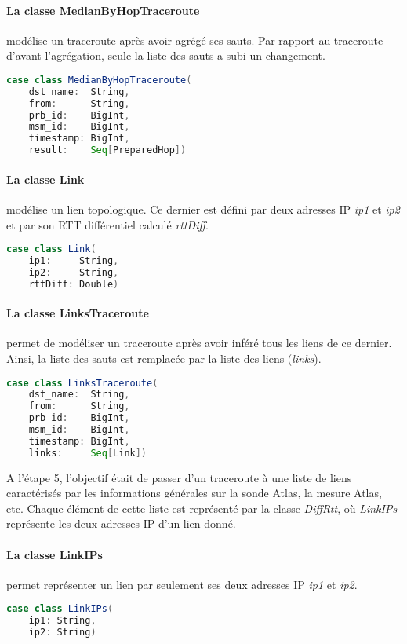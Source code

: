 \paragraph{La classe MedianByHopTraceroute } modélise un traceroute après avoir agrégé ses sauts. Par rapport au traceroute d'avant l'agrégation, seule la liste des sauts  a subi un changement. 
\begin{lstlisting}[language=scala, caption={La classe MedianByHopTraceroute en Scala }]
case class MedianByHopTraceroute(
	dst_name:  String,
	from:      String,
	prb_id:    BigInt,
	msm_id:    BigInt,
	timestamp: BigInt,
	result:    Seq[PreparedHop])
\end{lstlisting}


\paragraph{La classe Link} modélise un lien topologique. Ce dernier est défini par deux adresses IP  \textit{ip1} et \textit{ip2} et par son RTT différentiel calculé \textit{rttDiff}.
\begin{lstlisting}[language=scala, caption={La classe Link en Scala }]
case class Link(
	ip1:     String,
	ip2:     String,
	rttDiff: Double)
\end{lstlisting}

\paragraph{La classe LinksTraceroute} permet de modéliser un traceroute après avoir inféré tous les liens de ce dernier. Ainsi, la liste des sauts est remplacée par la liste des liens (\textit{links}). 

\begin{lstlisting}[language=scala, caption={La classe LinksTraceroute en Scala }]
case class LinksTraceroute(
	dst_name:  String,
	from:      String,
	prb_id:    BigInt,
	msm_id:    BigInt,
	timestamp: BigInt,
	links:     Seq[Link])
\end{lstlisting}


A l'étape 5, l'objectif était de passer d'un traceroute à une liste de liens caractérisés par les informations générales sur la sonde Atlas, la mesure Atlas, etc. Chaque élément de cette liste est représenté par la classe \textit{DiffRtt}, où \textit{LinkIPs} représente les deux adresses IP d'un lien donné.
\paragraph{La classe LinkIPs} permet représenter un lien par seulement ses deux adresses IP \textit{ip1} et \textit{ip2}.
\begin{lstlisting}[language=scala, caption={La classe LinkIPs en Scala }]
case class LinkIPs(
	ip1: String,
	ip2: String)
\end{lstlisting}

